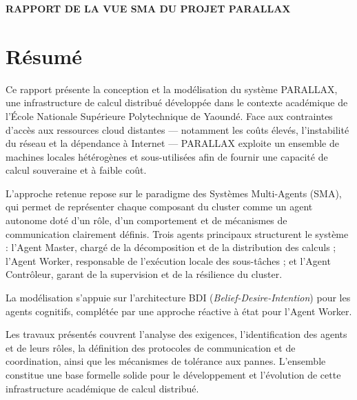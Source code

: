 \documentclass[12pt,a4paper]{report}
\begin{document}
\begin{titlepage}
    \centering
    \vspace*{2cm}
    {\Large\bfseries RAPPORT DE LA VUE SMA DU PROJET PARALLAX \\}
    \vspace{1cm}
   
    \vfill
    
\end{titlepage}

\chapter*{Résumé}

Ce rapport présente la conception et la modélisation du système PARALLAX, une infrastructure de calcul distribué développée dans le contexte académique de l'École Nationale Supérieure Polytechnique de Yaoundé. Face aux contraintes d'accès aux ressources cloud distantes — notamment les coûts élevés, l'instabilité du réseau et la dépendance à Internet — PARALLAX exploite un ensemble de machines locales hétérogènes et sous-utilisées afin de fournir une capacité de calcul souveraine et à faible coût.

L'approche retenue repose sur le paradigme des Systèmes Multi-Agents (SMA), qui permet de représenter chaque composant du cluster comme un agent autonome doté d'un rôle, d'un comportement et de mécanismes de communication clairement définis. Trois agents principaux structurent le système : l'Agent Master, chargé de la décomposition et de la distribution des calculs ; l'Agent Worker, responsable de l'exécution locale des sous-tâches ; et l'Agent Contrôleur, garant de la supervision et de la résilience du cluster.

La modélisation s'appuie sur l'architecture BDI (\textit{Belief-Desire-Intention}) pour les agents cognitifs, complétée par une approche réactive à état pour l'Agent Worker.

Les travaux présentés couvrent l'analyse des exigences, l'identification des agents et de leurs rôles, la définition des protocoles de communication et de coordination, ainsi que les mécanismes de tolérance aux pannes. L'ensemble constitue une base formelle solide pour le développement et l'évolution de cette infrastructure académique de calcul distribué.
\end{document}
